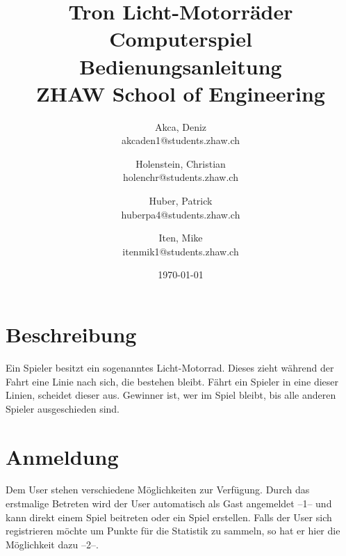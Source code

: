 \documentclass[11pt,ngerman]{article}
\begin{document}
    \title{Tron Licht-Motorräder Computerspiel\\
        \vspace{1cm}
        Bedienungsanleitung \\
        \vspace{0.5cm}
        \small{}ZHAW  School of Engineering
        \vspace{1.5cm}
    }
    \author{
        Akca, Deniz\\
        \small{akcaden1@students.zhaw.ch}
        \and
        Holenstein, Christian\\
        \small{holenchr@students.zhaw.ch}
        \and
        Huber, Patrick\\
        \small{huberpa4@students.zhaw.ch}
        \and
        Iten, Mike\\
        \small{itenmik1@students.zhaw.ch}
        \vspace{1.5cm}
    }
   \date{\today}

    \maketitle
    \newpage

    \tableofcontents
	\listoffigures
    \newpage
    
    \section{Beschreibung}
    
    Ein Spieler besitzt ein sogenanntes Licht-Motorrad. Dieses zieht während der Fahrt eine Linie nach sich, die bestehen bleibt. Fährt ein Spieler in eine dieser Linien, scheidet dieser aus. Gewinner ist, wer im Spiel bleibt, bis alle anderen Spieler ausgeschieden sind.
    
    \section{Anmeldung}
    
    Dem User stehen verschiedene Möglichkeiten zur Verfügung. Durch das erstmalige Betreten wird der User automatisch als Gast angemeldet --1-- und kann direkt einem Spiel beitreten oder ein Spiel erstellen. 
    Falls der User sich registrieren möchte um Punkte für die Statistik zu sammeln, so hat er hier die Möglichkeit dazu --2--. 
    
\end{document}
